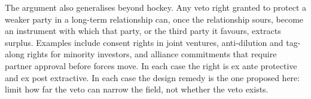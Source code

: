 The argument also generalises beyond hockey. Any veto right granted to protect a weaker party in a long-term relationship can, once the relationship sours, become an instrument with which that party, or the third party it favours, extracts surplus. Examples include consent rights in joint ventures, anti-dilution and tag-along rights for minority investors, and alliance commitments that require partner approval before forces move. In each case the right is ex ante protective and ex post extractive. In each case the design remedy is the one proposed here: limit how far the veto can narrow the field, not whether the veto exists.
